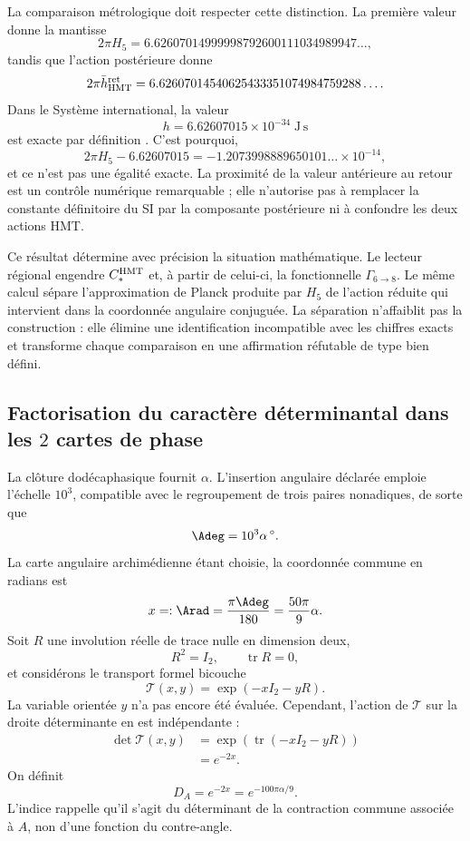La comparaison métrologique doit respecter cette distinction. La première valeur donne
la mantisse
\[
2\pi H_5
=6.62607014999998792600111034989947\ldots,
\]
tandis que l'action postérieure donne
\[
2\pi\bar h_{\rm HMT}^{\rm ret}
=6.62607014540625433351074984759288\ldots.
\]
Dans le Système international, la valeur
\[
h=6.62607015\times10^{-34}\;\mathrm{J\,s}
\]
est exacte par définition \cite{BIPMSI}. C'est pourquoi,
\[
2\pi H_5-6.62607015
=-1.2073998889650101\ldots\times10^{-14},
\]
et ce n'est pas une égalité exacte. La proximité de la valeur antérieure au retour est
un contrôle numérique remarquable ; elle n'autorise pas à remplacer la constante définitoire
du SI par la composante postérieure ni à confondre les deux actions HMT\@.

Ce résultat détermine avec précision la situation mathématique. Le lecteur
régional engendre \(C_*^{\rm HMT}\) et, à partir de celui-ci, la fonctionnelle
\(\Gamma_{6\to8}\). Le même calcul sépare l'approximation de Planck
produite par \(H_5\) de l'action réduite qui intervient dans
la coordonnée angulaire conjuguée. La séparation n'affaiblit pas la construction : elle élimine une
identification incompatible avec les chiffres exacts et transforme chaque
comparaison en une affirmation réfutable de type bien défini.

\subsection{Factorisation du caractère déterminantal dans les \texorpdfstring{\(2\)}{2} cartes de phase}
\label{sec:s102:c38:3:4}


La clôture dodécaphasique fournit \(\alpha\). L'insertion angulaire déclarée
emploie l'échelle \(10^3\), compatible avec le regroupement de trois paires
nonadiques, de sorte que
\[
\Adeg=10^3\alpha\,{}^\circ.
\]
La carte angulaire archimédienne étant choisie, la coordonnée commune en radians est
\[
x=: \Arad=\frac{\pi\Adeg}{180}=\frac{50\pi}{9}\alpha.
\]
Soit \(R\) une involution réelle de trace nulle en dimension deux,
\[
R^2=I_2,
\qquad
\operatorname{tr}R=0,
\]
et considérons le transport formel bicouche
\[
\mathcal T(x,y)=\exp(-xI_2-yR).
\]
La variable orientée \(y\) n'a pas encore été évaluée. Cependant, l'action
de \(\mathcal T\) sur la droite déterminante en est indépendante :
\[
\begin{aligned}
\det\mathcal T(x,y)
&=\exp\!\left(\operatorname{tr}(-xI_2-yR)\right)\\
&=e^{-2x}.
\end{aligned}
\]
On définit
\[
\boxed{
D_A=e^{-2x}=e^{-100\pi\alpha/9}.}
\]
L'indice rappelle qu'il s'agit du déterminant de la contraction commune
associée à \(A\), non d'une fonction du contre-angle.

